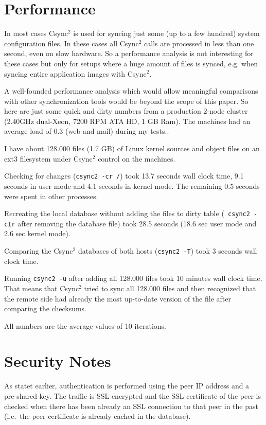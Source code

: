 \documentclass[a4paper,twocolumn]{article}
\def\csync2{{\sc Csync$^{2}$}}
\begin{document}
\section{Performance}

In most cases \csync2 is used for syncing just some (up to a few hundred) system
configuration files. In these cases all \csync2 calls are processed in less than
one second, even on slow hardware. So a performance analysis is not interesting
for these cases but only for setups where a huge amount of files is synced,
e.g. when syncing entire application images with \csync2.

A well-founded performance analysis which would allow meaningful comparisons
with other synchronization tools would be beyond the scope of this paper.
So here are just some quick and dirty numbers from a production
2-node cluster (2.40GHz dual-Xeon, 7200 RPM ATA HD, 1 GB Ram). The machines
had an average load of 0.3 (web and mail) during my tests..

I have about 128.000 files (1.7 GB) of Linux kernel sources and object
files on an ext3 filesystem under \csync2 control on the machines.

Checking for changes ({\tt csync2 -cr /}) took 13.7 seconds wall clock time,
9.1 seconds in user mode and 4.1 seconds in kernel mode. The remaining 0.5
seconds were spent in other processes.

Recreating the local database without adding the files to dirty table ({\tt
csync2 -cIr} after removing the database file) took 28.5 seconds (18.6 sec
user mode and 2.6 sec kernel mode). 

Comparing the \csync2 databases of both hosts ({\tt csync2 -T}) took 3 seconds
wall clock time.

Running {\tt csync2 -u} after adding all 128.000 files took 10 minutes wall
clock time. That means that \csync2 tried to sync all 128.000 files and then
recognized that the remote side had already the most up-to-date version of
the file after comparing the checksums.

All numbers are the average values of 10 iterations.

\section{Security Notes}

As statet earlier, authentication is performed using the peer IP address and a
pre-shared-key. The traffic is SSL encrypted and the SSL certificate of the
peer is checked when there has been already an SSL connection to that peer in
the past (i.e.~the peer certificate is already cached in the database).
\end{document}

